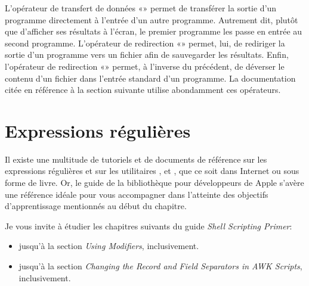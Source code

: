 L'opérateur de transfert de données  «\code{\textbar}» permet de transférer la sortie d'un
programme directement à l'entrée d'un autre programme. Autrement dit,
plutôt que d'afficher ses résultats à l'écran, le premier programme
les passe en entrée au second programme. L'opérateur de redirection
«\code{>}» permet, lui, de rediriger la
sortie d'un programme vers un fichier afin de sauvegarder les
résultats. Enfin, l'opérateur de redirection «\code{<}» permet, à l'inverse du précédent, de déverser le
contenu d'un fichier dans l'entrée standard d'un programme. La
documentation citée en référence à la section suivante utilise
abondamment ces opérateurs.



\section{Expressions régulières}
\label{sec:texte:regex}

Il existe une multitude de tutoriels et de documents de référence sur
les expressions régulières et sur les utilitaires ,
 et , que ce soit dans Internet ou sous forme de
livre. Or, le guide  de la bibliothèque
pour développeurs de Apple \citep{Apple:shellprimer} s'avère une
référence idéale pour vous accompagner dans l'atteinte des objectifs
d'apprentissage mentionnés au début du chapitre.


Je vous invite à étudier les chapitres suivants du guide \emph{Shell
  Scripting Primer}:
\begin{itemize}
\item
   jusqu'à la section \emph{Using
    Modifiers}, inclusivement.
\item
   jusqu'à la section \emph{Changing the Record and
    Field Separators in AWK Scripts}, inclusivement.
\end{itemize}

